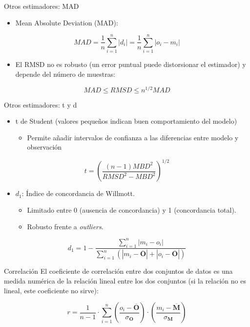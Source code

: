 \documentclass[xcolor={usenames,svgnames,dvipsnames}]{beamer}
\let\cite\parencite
\begin{document}
\begin{frame}[label=sec-4-4]{Otros estimadores: MAD}
\begin{itemize}
\item Mean Absolute Deviation (MAD):
\end{itemize}

\[
MAD = \frac{1}{n} \sum_{i=1}^n \left|d_i\right| =  \frac{1}{n} \sum_{i=1}^n \left|o_i - m_i\right|
\]
\begin{itemize}
\item El RMSD no es robusto (un error puntual puede distorsionar el estimador) y depende del número de muestras:
\end{itemize}
\[
MAD \leq RMSD \leq n^{1/2} MAD
\]

\cite{Willmott.Matsuura.ea2009, Willmott.Matsuura2005a}
\end{frame}
\begin{frame}[label=sec-4-5]{Otros estimadores: t y d}
\begin{itemize}
\item t de Student (valores pequeños indican buen comportamiento del modelo)
\begin{itemize}
\item Permite añadir intervalos de confianza a las diferencias entre
modelo y observación
\end{itemize}
\end{itemize}

\[
t = \left ( \frac{(n-1) MBD^2}{RMSD^2 - MBD^2} \right)^{1/2}
\]

\nocite{Stone1993}

\pause 

\begin{itemize}
\item $d_1$: Índice de concordancia de Willmott.
\begin{itemize}
\item Limitado entre 0 (ausencia de concordancia) y 1 (concordancia total).
\item Robusto frente a \emph{outliers}.
\end{itemize}
\end{itemize}
\[
d_1 = 1 - \frac{\sum_{i=1}^n \left| m_i - o_i \right|}{\sum_{i=1}^n \left(
  \left| m_i - \overline{\mathbf{O}}\right| + \left| o_i -
    \overline{\mathbf{O}} \right| \right)}
\]

\cite{Willmott.Robeson.ea2012}
\end{frame}
\begin{frame}[label=sec-4-6]{Correlación}
El coeficiente de correlación entre dos conjuntos de datos es una
medida numérica de la relación \alert{lineal} entre los dos conjuntos (si la
relación no es lineal, este coeficiente no sirve):

\[
r = \frac{1}{n-1} \cdot \sum_{i=1}^{n} \left( \frac{o_{i}-\overline{\mathbf{O}}}{\sigma_{\mathbf{O}}}\right) \cdot \left(\frac{m_{i}-\overline{\mathbf{M}}}{\sigma_{\mathbf{M}}}\right)
\]
\end{frame}
\end{document}
